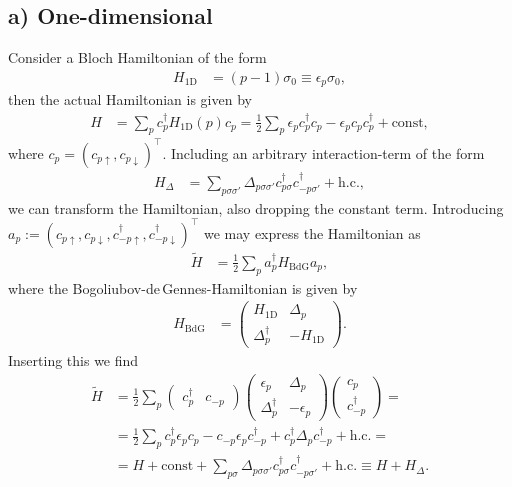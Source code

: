 \documentclass[english, parskip=full]{scrartcl}
\newcommand{\kla}{}
\newcommand{\tecxt}{}
\begin{document}
\subsection*{a) One-dimensional}
Consider a Bloch Hamiltonian of the form
\begin{align}
H_{1\tecxt\text{D}} &= \kla\left( p - 1 \right)\sigma_0 \equiv \epsilon_p\sigma_0,
\end{align}
then the actual Hamiltonian is given by
\begin{align}
H &= \sum_{p} c_p^\dagger  H_{1\tecxt\text{D}}(p) c_p = \frac{1}{2} \sum_p \epsilon_pc_p^\dagger c_p - \epsilon_p c_pc_p^\dagger + \tecxt\text{const},
\end{align}
where $c_p = (c_{p\uparrow}, c_{p\downarrow})^\top$. 
Including an arbitrary interaction-term of the form
\begin{align}
H_\Delta &= \sum_{p\sigma\sigma'} \Delta_{p\sigma\sigma'} c_{p\sigma}^\dagger c_{-p\sigma'}^\dagger + \tecxt\text{h.c.},
\end{align}
we can transform the Hamiltonian, also dropping the constant term.
Introducing $a_p := (c_{p\uparrow}, c_{p\downarrow}, c_{-p\uparrow}^\dagger, c_{-p\downarrow}^\dagger)^\top$ we may express the Hamiltonian as
\begin{align}
\tilde{H} &= \frac{1}{2}\sum_p a_p^\dagger H_\tecxt\text{BdG} a_p,
\end{align}
where the Bogoliubov-de\,Gennes-Hamiltonian is given by
\begin{align}
H_\tecxt\text{BdG} &= \begin{pmatrix}
H_{1\tecxt\text{D}} & \Delta_p \\ \Delta_p^\dagger & -H_{1\tecxt\text{D}}
\end{pmatrix}.
\end{align}
Inserting this we find
\begin{align}
\tilde{H} &= \frac{1}{2}\sum_p \begin{pmatrix}
c_p^\dagger & c_{-p}
\end{pmatrix} \begin{pmatrix}
\epsilon_p & \Delta_p \\ \Delta_p^\dagger & -\epsilon_p
\end{pmatrix} \begin{pmatrix}
 c_p \\ c_{-p}^\dagger
\end{pmatrix} = \\
&= \frac{1}{2}\sum_p c_p^\dagger \epsilon_p c_p - c_{-p} \epsilon_p c_{-p}^\dagger + c_p^\dagger \Delta_p c_{-p}^\dagger + \tecxt\text{h.c.} = \\
&= H + \tecxt\text{const} + \sum_{p\sigma} \Delta_{p\sigma\sigma'} c_{p\sigma}^\dagger c_{-p\sigma'}^\dagger + \tecxt\text{h.c.} \equiv H + H_\Delta.
\end{align}
\end{document}
